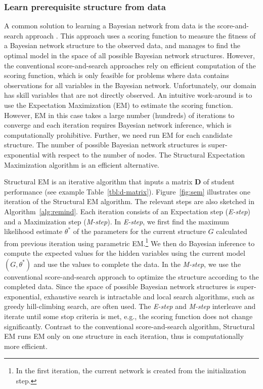\documentclass{edm_template}
\begin{document}
\subsubsection{Learn prerequisite structure from data}

A common solution to learning a Bayesian network from data is the score-and-search approach \cite{cooper1992bayesian,heckerman1997bayesian}.
This approach uses a scoring function to measure the fitness of a Bayesian network structure to the observed data, 
and manages to find the optimal model in the space of all possible Bayesian network structures.
However, the conventional score-and-search approaches rely on efficient computation of the scoring function, 
which is only feasible for problems where data contains observations for all variables in the Bayesian network.
Unfortunately, our domain has   skill variables that are  not directly observed.
An intuitive work-around is to use the Expectation Maximization (EM) to estimate the scoring function.
However, EM in this case takes a large number (hundreds) of iterations to converge and each iteration requires Bayesian network inference, 
which is computationally prohibitive.
Further, we need run EM for each candidate structure. The number of possible Bayesian network structures is super-exponential with respect to the number of nodes.
The Structural Expectation Maximization algorithm \cite{friedman1997learning,friedman1998bayesian} is an efficient alternative.


Structural EM is an iterative algorithm that  inputs a matrix $\mathbf{D}$ of student performance (see example Table~\ref{tbl:d-matrix}). %
Figure~\ref{fig:sem} illustrates one iteration of the Structural EM algorithm. The relevant steps are also sketched in Algorithm~\ref{alg:remind}. 
Each iteration consists of an Expectation step (\emph{E-step}) and a Maximization step (\emph{M-step}). 
In \emph{E-step}, we first find the maximum likelihood estimate $\theta^*$ of the parameters 
for the current structure $G$ calculated from previous iteration using parametric EM.\footnote{In the first iteration, the current network is created from the initialization step.}
We then do Bayesian inference to compute the expected values for the hidden variables using the current model $(G,\theta^*)$
and use the values to complete the data.
In the \emph{M-step}, we use the conventional score-and-search approach to optimize the structure according to the completed data.
Since the space of possible Bayesian network structures is super-exponential, 
exhaustive search is intractable and local search algorithms, such as greedy hill-climbing search, are often used.
The \emph{E-step} and \emph{M-step} interleave and iterate until some stop criteria is met, e.g., the scoring function does not change significantly.
Contrast to the conventional score-and-search algorithm, Structural EM runs EM only on one structure in each iteration, thus is computationally more efficient.
\end{document}
